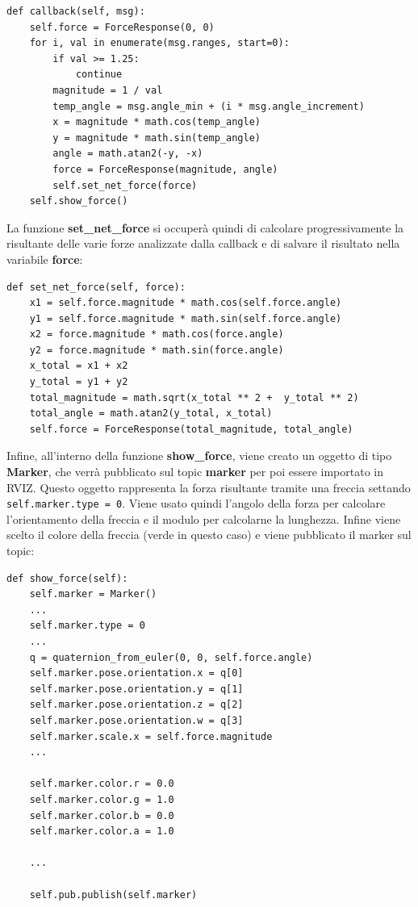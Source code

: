 \documentclass[Lau, binding=0.6cm, oneside]{sapthesis}
\begin{document}
\begin{lstlisting}
def callback(self, msg):
    self.force = ForceResponse(0, 0)
    for i, val in enumerate(msg.ranges, start=0):
        if val >= 1.25:
            continue
        magnitude = 1 / val
        temp_angle = msg.angle_min + (i * msg.angle_increment)
        x = magnitude * math.cos(temp_angle)
        y = magnitude * math.sin(temp_angle)
        angle = math.atan2(-y, -x)
        force = ForceResponse(magnitude, angle)
        self.set_net_force(force)
    self.show_force()
\end{lstlisting}

La funzione \textbf{set\_net\_force} si occuperà quindi di calcolare progressivamente la risultante delle varie forze analizzate dalla callback e di salvare il risultato nella variabile \textbf{force}:

\begin{lstlisting}
def set_net_force(self, force):
    x1 = self.force.magnitude * math.cos(self.force.angle)
    y1 = self.force.magnitude * math.sin(self.force.angle)
    x2 = force.magnitude * math.cos(force.angle)
    y2 = force.magnitude * math.sin(force.angle)
    x_total = x1 + x2
    y_total = y1 + y2
    total_magnitude = math.sqrt(x_total ** 2 +  y_total ** 2)
    total_angle = math.atan2(y_total, x_total)
    self.force = ForceResponse(total_magnitude, total_angle)
\end{lstlisting}

Infine, all'interno della funzione \textbf{show\_force}, viene creato un oggetto di tipo \textbf{Marker}, che verrà pubblicato sul topic \textbf{marker} per poi essere importato in RVIZ.
Questo oggetto rappresenta la forza risultante tramite una freccia settando \lstinline{self.marker.type = 0}.
Viene usato quindi l'angolo della forza per calcolare l'orientamento della freccia e il modulo per calcolarne la lunghezza.
Infine viene scelto il colore della freccia (verde in questo caso) e viene pubblicato il marker sul topic:

\begin{lstlisting}
def show_force(self):
    self.marker = Marker()
    ...
    self.marker.type = 0
    ...
    q = quaternion_from_euler(0, 0, self.force.angle)
    self.marker.pose.orientation.x = q[0]
    self.marker.pose.orientation.y = q[1]
    self.marker.pose.orientation.z = q[2]
    self.marker.pose.orientation.w = q[3]
    self.marker.scale.x = self.force.magnitude
    ...

    self.marker.color.r = 0.0
    self.marker.color.g = 1.0
    self.marker.color.b = 0.0
    self.marker.color.a = 1.0

    ...

    self.pub.publish(self.marker)
\end{lstlisting}
\end{document}
